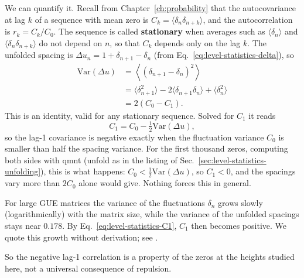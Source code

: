 We can quantify it. Recall from Chapter~\ref{ch:probability} that the autocovariance at lag $k$ of a sequence with mean zero is $C_k=\langle\delta_n\delta_{n+k}\rangle$, and the autocorrelation is $r_k=C_k/C_0$. The sequence is called \textbf{stationary} when averages such as $\langle\delta_n\rangle$ and $\langle\delta_n\delta_{n+k}\rangle$ do not depend on $n$, so that $C_k$ depends only on the lag $k$. The unfolded spacing is $\Delta u_n=1+\delta_{n+1}-\delta_n$ (from Eq.~\eqref{eq:level-statistics-delta}), so
\begin{align}
\mathrm{Var}(\Delta u)&=\left\langle(\delta_{n+1}-\delta_n)^2\right\rangle\nonumber\\
&=\langle\delta_{n+1}^2\rangle-2\langle\delta_{n+1}\delta_n\rangle+\langle\delta_n^2\rangle\nonumber\\
&=2\left(C_0-C_1\right).
\label{eq:level-statistics-varlink}
\end{align}
This is an identity, valid for any stationary sequence. Solved for $C_1$ it reads
\begin{equation}
C_1=C_0-\tfrac12\mathrm{Var}(\Delta u),
\label{eq:level-statistics-C1}
\end{equation}
so the lag-1 covariance is negative exactly when the fluctuation variance $C_0$ is smaller than half the spacing variance. For the first thousand zeros, computing both sides with qmnt (unfold as in the listing of Sec.~\ref{sec:level-statistics-unfolding}), this is what happens: $C_0<\tfrac12\mathrm{Var}(\Delta u)$, so $C_1<0$, and the spacings vary more than $2C_0$ alone would give. Nothing forces this in general.

\begin{beyond}
For large GUE matrices the variance of the fluctuations $\delta_n$ grows slowly (logarithmically) with the matrix size, while the variance of the unfolded spacings stays near $0.178$. By Eq.~\eqref{eq:level-statistics-C1}, $C_1$ then becomes positive. We quote this growth without derivation; see \cite{mehta}.
\end{beyond}

So the negative lag-1 correlation is a property of the zeros at the heights studied here, not a universal consequence of repulsion.

